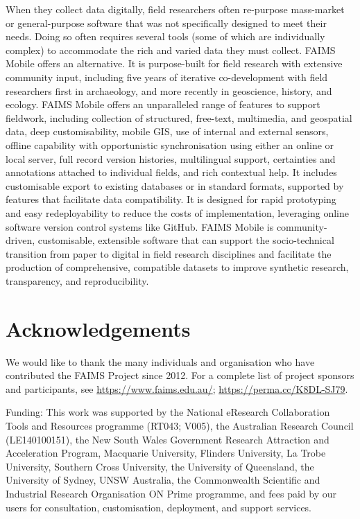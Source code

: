 \documentclass[preprint,12pt, a4paper]{elsarticle}
\begin{document}
When they collect data digitally, field researchers often re-purpose mass-market or general-purpose software that was not specifically designed to meet their needs. Doing so often requires several tools (some of which are individually complex) to accommodate the rich and varied data they must collect. FAIMS Mobile offers an alternative. It is purpose-built for field research with extensive community input, including five years of iterative co-development with field researchers first in archaeology, and more recently in geoscience, history, and ecology. FAIMS Mobile offers an unparalleled range of features to support fieldwork, including collection of structured, free-text, multimedia, and geospatial data, deep customisability, mobile GIS, use of internal and external sensors, offline capability with opportunistic synchronisation using either an online or local server, full record version histories, multilingual support, certainties and annotations attached to individual fields, and rich contextual help. It includes customisable export to existing databases or in standard formats, supported by features that facilitate data compatibility. It is designed for rapid prototyping and easy redeployability to reduce the costs of implementation, leveraging online software version control systems like GitHub. FAIMS Mobile is community-driven, customisable, extensible software that can support the socio-technical transition from paper to digital in field research disciplines and facilitate the production of comprehensive, compatible datasets to improve synthetic research, transparency, and reproducibility.  


\appendix


\section*{Acknowledgements}


We would like to thank the many individuals and organisation who have contributed the FAIMS Project since 2012. For a complete list of project sponsors and participants, see \url{https://www.faims.edu.au/}; \url{https://perma.cc/K8DL-SJ79}.

Funding: This work was supported by the National eResearch Collaboration Tools and Resources programme (RT043; V005), the Australian Research Council (LE140100151), the New South Wales Government Research Attraction and Acceleration Program, Macquarie University, Flinders University, La Trobe University, Southern Cross University, the University of Queensland, the University of Sydney, UNSW Australia, the Commonwealth Scientific and Industrial Research Organisation ON Prime programme, and fees paid by our users for consultation, customisation, deployment, and support services.
\end{document}
